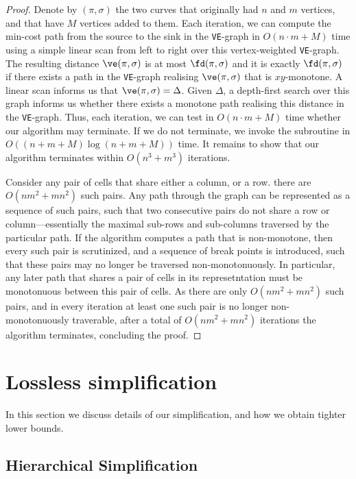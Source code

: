 \shootup*
\begin{proof}
    Denote by $(\pi, \sigma)$ the two curves that originally had $n$ and $m$ vertices, and that have $M$ vertices added to them. 
    Each iteration, we can compute the min-cost path from the source to the sink in the \texttt{VE}-graph in $O(n\cdot m + M)$ time using a simple linear scan from left to right over this vertex-weighted \texttt{VE}-graph.
    The resulting distance $\ve(\pi, \sigma)$ is at most $\fd(\pi, \sigma)$ and it is exactly $\fd(\pi, \sigma)$ if there exists a path in the \texttt{VE}-graph realising $\ve(\pi, \sigma)$ that is $xy$-monotone. 
    A linear scan informs us that $\ve(\pi, \sigma) = \Delta$.
    Given $\Delta$, a depth-first search over this graph informs us whether there exists a monotone path realising this distance in the \texttt{VE}-graph.
    Thus, each iteration, we can test in $O(n\cdot m + M)$ time whether our algorithm may terminate. 
    If we do not terminate, we invoke the subroutine in $O((n+m+M) \log (n+m+M))$ time. 
    It remains to show that our algorithm terminates  within $O(n^3+m^3)$ iterations. 

    Consider any pair of cells that share either a column, or a row. there are $O(nm^2 + mn^2)$ such pairs. Any path through the graph can be represented as a sequence of such pairs, such that two consecutive pairs do not share a row or column---essentially the maximal sub-rows and sub-columns traversed by the particular path. If the algorithm computes a path that is non-monotone, then every such pair is scrutinized, and a sequence of break points is introduced, such that these pairs may no longer be traversed non-monotonuously. In particular, any later path that shares a pair of cells in its represetntation must be monotonuous between this pair of cells. As there are only $O(nm^2 + mn^2)$ such pairs, and in every iteration at least one such pair is no longer non-monotonuously traverable, after a total of $O(nm^2 + mn^2)$ iterations the algorithm terminates, concluding the proof.
\end{proof}




\section{Lossless simplification}
\label{sec:lossless}

In this section we discuss details of our simplification, and how we obtain tighter lower bounds.

\subsection{Hierarchical Simplification}

